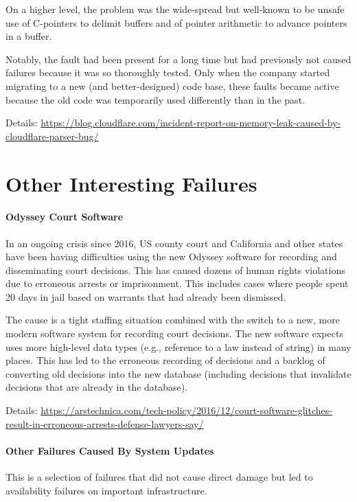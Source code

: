 On a higher level, the problem was the wide-spread but well-known to be unsafe use of C-pointers to delimit buffers and of pointer arithmetic to advance pointers in a buffer.

Notably, the fault had been present for a long time but had previously not caused failures because it was so thoroughly tested.
Only when the company started migrating to a new (and better-designed) code base, these faults became active because the old code was temporarily used differently than in the past.

Details: \url{https://blog.cloudflare.com/incident-report-on-memory-leak-caused-by-cloudflare-parser-bug/}


\section{Other Interesting Failures}

\paragraph{Odyssey Court Software}
In an ongoing crisis since 2016, US county court and California and other states have been having difficulties using the new Odyssey software for recording and disseminating court decisions.
This has caused dozens of human rights violations due to erroneous arrests or imprisonment.
This includes cases where people spent 20 days in jail based on warrants that had already been dismissed.

The cause is a tight staffing situation combined with the switch to a new, more modern software system for recording court decisions.
The new software expects uses more high-level data types (e.g., reference to a law instead of string) in many places.
This has led to the erroneous recording of decisions and a backlog of converting old decisions into the new database (including decisions that invalidate decisions that are already in the database).

Details: \url{https://arstechnica.com/tech-policy/2016/12/court-software-glitches-result-in-erroneous-arrests-defense-lawyers-say/}

\paragraph{Other Failures Caused By System Updates}
This is a selection of failures that did not cause direct damage but led to availability failures on important infrastructure.

